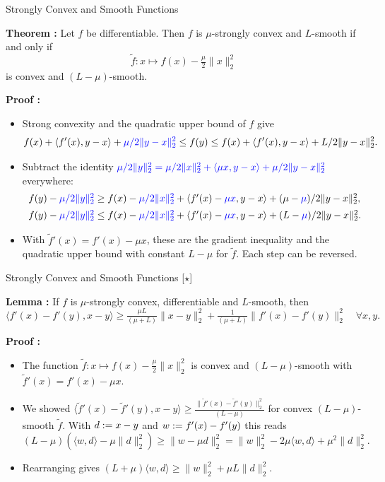 \documentclass[9pt]{beamer}
\begin{document}
\begin{frame}{Strongly Convex and Smooth Functions}

  \textbf{Theorem :} Let $f$ be differentiable. Then $f$ is $\mu$-strongly convex and $L$-smooth if and only if
  \[
    \tilde f:x\mapsto f(x)-\tfrac{\mu}{2}\|x\|_2^2
  \]
  is convex and $(L-\mu)$-smooth. 
  \vfill

  \textbf{Proof :}
  \begin{itemize}
  \item<2-> Strong convexity and the quadratic upper bound of $f$ give
    \[
      f(x)+\langle f'(x), y-x\rangle+{\color{blue} {\mu}/{2}\|y-x\|_2^2} \leq f(y) \leq f(x)+\langle f'(x), y-x\rangle+{L}/{2}\|y-x\|_2^2.
    \]
  \item<3-> Subtract the identity ${\color{blue} {\mu}/{2}\|y\|_2^2={\mu}/{2}\|x\|_2^2+\langle \mu x, y-x\rangle +{\mu}/{2}\|y-x\|_2^2}$ everywhere:
    \[
      \begin{array}{r@{}l}
        f(y)-\blue{\tfrac{\mu}{2}\|y\|_2^2} &{}\geq f(x)-\blue{\tfrac{\mu}{2}\|x\|_2^2}+\langle f'(x)-\blue{\mu x}, y-x\rangle+\tfrac{(\mu-\blue{\mu})}{2}\|y-x\|_2^2,\\[0.5em]
        f(y)-\blue{\tfrac{\mu}{2}\|y\|_2^2} &{}\leq f(x)-\blue{\tfrac{\mu}{2}\|x\|_2^2}+\langle f'(x)-\blue{\mu x}, y-x\rangle+\tfrac{(L-\blue{\mu})}{2}\|y-x\|_2^2.
      \end{array}
    \]
  \item<4-> With $\tilde f'(x)=f'(x)-\mu x$, these are the gradient inequality and the quadratic upper bound with constant $L-\mu$ for $\tilde f$. Each step can be reversed.
  \end{itemize}

\end{frame}

\begin{frame}{Strongly Convex and Smooth Functions [$\star$]}

  \textbf{Lemma :} If $f$ is $\mu$-strongly convex, differentiable and $L$-smooth, then
  \[
    \langle f'(x)-f'(y), x-y\rangle \geq \tfrac{\mu L}{(\mu+L)}\|x-y\|_2^2 + \tfrac{1}{(\mu+L)}\|f'(x)-f'(y)\|_2^2 \quad \forall x, y.
  \]

  \vfill

  \textbf{Proof :}
  \begin{itemize}
  \item The function $\tilde f:x\mapsto f(x)-\tfrac{\mu}{2}\|x\|_2^2$ is convex and $(L-\mu)$-smooth with $\tilde f'(x)=f'(x)-\mu x$.
  \item We showed $\langle \tilde f'(x)-\tilde f'(y), x-y\rangle \geq \tfrac{\|\tilde f'(x)-\tilde f'(y)\|_2^2}{(L-\mu)}$ for convex $(L-\mu)$-smooth $\tilde f$. With $d:= x-y$ and $w:= f'(x)-f'(y)$ this reads
    \[
      (L-\mu)(\langle w, d\rangle -\mu\|d\|_2^2)\geq \|w-\mu d\|_2^2 = \|w\|_2^2-2\mu\langle w, d\rangle +\mu^2\|d\|_2^2.
    \]
  \item Rearranging gives $(L+\mu)\langle w, d\rangle \geq \|w\|_2^2+\mu L\|d\|_2^2$.
  \end{itemize}

\end{frame}
\end{document}
